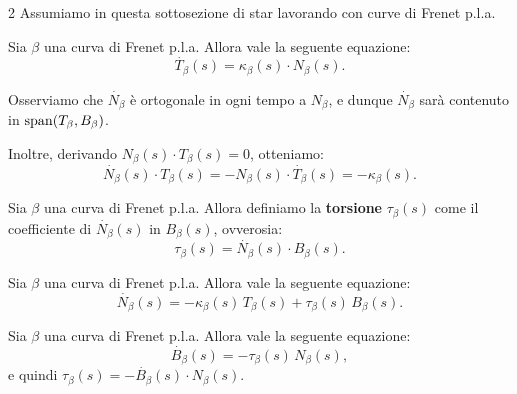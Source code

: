 \begin{multicols*}{2}
    Assumiamo in questa sottosezione di star lavorando con curve di Frenet p.l.a.

    \begin{proposition}
        Sia $\beta$ una curva di Frenet p.l.a. Allora vale la seguente
        equazione:
        \begin{equation} \label{eq:frenet_1} \tag{F1}
            \boxed{\dot{T_\beta}(s) = \kappa_\beta(s) \cdot N_\beta(s).}
        \end{equation}
    \end{proposition}

    \begin{remark}
        Osserviamo che $\dot{N_\beta}$ è ortogonale in ogni tempo
        a $N_\beta$, e dunque $\dot{N_\beta}$ sarà contenuto in
        $\operatorname{span}(T_\beta, B_\beta)$. \medskip

        Inoltre, derivando $N_\beta(s) \cdot T_\beta(s) = 0$, otteniamo:
        \[ \dot{N_\beta}(s) \cdot T_\beta(s) = -N_\beta(s) \cdot \dot{T_\beta}(s) = -\kappa_\beta(s). \]
    \end{remark}

    \begin{definition}[Torsione]
        Sia $\beta$ una curva di Frenet p.l.a. Allora definiamo la
        \textbf{torsione} $\tau_\beta(s)$ come il coefficiente di $\dot{N_\beta}(s)$ in
        $B_\beta(s)$, ovverosia:
        \[ \boxed{\tau_\beta(s) = \dot{N_\beta}(s) \cdot B_\beta(s).} \]
    \end{definition}

    \begin{proposition}
        Sia $\beta$ una curva di Frenet p.l.a. Allora vale la seguente
        equazione:
        \begin{equation} \label{eq:frenet_2} \tag{F2}
            \boxed{\dot{N_\beta}(s) = - \kappa_\beta(s) \, T_\beta(s) + \tau_\beta(s) \, B_\beta(s).}
        \end{equation}
    \end{proposition}

    \begin{proposition}
        Sia $\beta$ una curva di Frenet p.l.a. Allora vale la seguente
        equazione:
        \begin{equation} \label{eq:frenet_3} \tag{F3}
            \boxed{\dot{B_\beta}(s) = -\tau_\beta(s) \, N_\beta(s),}
        \end{equation}
        e quindi $\boxed{\tau_\beta(s) = -\dot{B_\beta}(s) \cdot N_\beta(s)}$.
    \end{proposition}


\end{multicols*}
